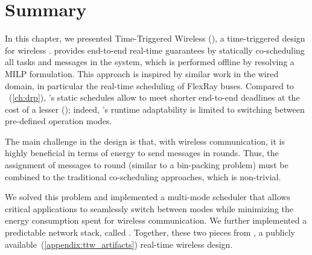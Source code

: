
\section{Summary}
\label{sec:ttw_conclusion}

In this chapter, we presented Time-Triggered Wireless (\TTW), a time-triggered design for wireless \CPS.
\TTW provides end-to-end real-time guarantees by statically co-scheduling all tasks and messages in the system, which is performed offline by resolving a MILP formulation.
This approach is inspired by similar work in the wired domain, in particular the real-time scheduling of FlexRay buses.
Compared to \DRP~(\cref{ch:drp}), \TTW's static schedules allow to meet shorter end-to-end deadlines  at the cost of a lesser (); indeed, \TTW's runtime adaptability is limited to switching between pre-defined operation modes.

The main challenge in the \TTW design is that, with wireless communication, it is highly beneficial in terms of energy to send messages in rounds. Thus, the assignment of messages to round (similar to a bin-packing problem) must be combined to the traditional co-scheduling approaches, which is non-trivial.

We solved this problem and implemented a multi-mode scheduler that allows critical applications to seamlessly switch between modes while minimizing the energy consumption spent for wireless communication.
We further implemented a predictable network stack, called \TTnet. Together, these two pieces from \TTW, a publicly available~(\cref{appendix:ttw_artifacts}) real-time wireless \CPS design.
